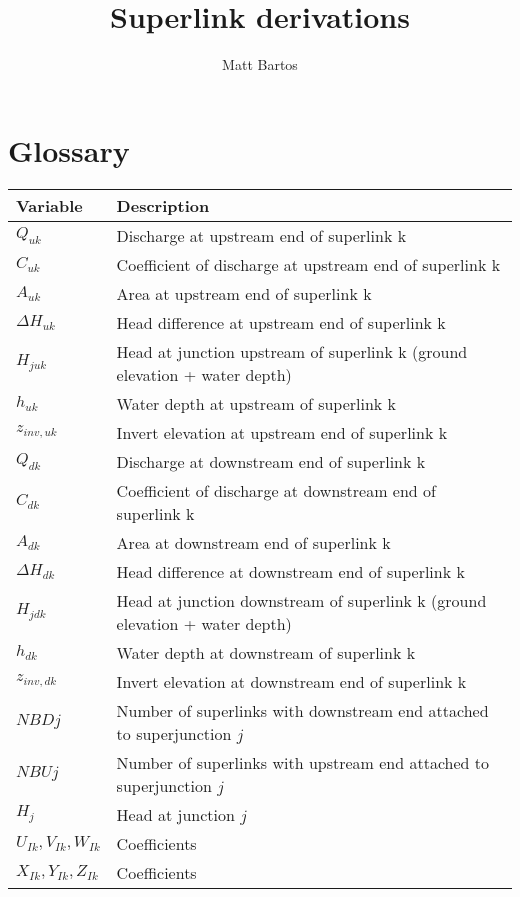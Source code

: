 \documentclass[11pt]{article}
\title{Superlink derivations}
\author{Matt Bartos}
\date{}
\begin{document}
\section*{Glossary}

\begin{table}[!htb]
  \centering
  \begin{tabular}{l | l}
    \hline
    Variable & Description \\
    \hline
    $Q_{uk}$ & Discharge at upstream end of superlink k \\
    $C_{uk}$ & Coefficient of discharge at upstream end of superlink k \\
    $A_{uk}$ & Area at upstream end of superlink k \\
    $\Delta H_{uk}$ & Head difference at upstream end of superlink k \\
    $H_{juk}$ & Head at junction upstream of superlink k (ground elevation + water depth) \\
    $h_{uk}$ & Water depth at upstream of superlink k \\
    $z_{inv, uk}$ & Invert elevation at upstream end of superlink k \\
    $Q_{dk}$ & Discharge at downstream end of superlink k \\
    $C_{dk}$ & Coefficient of discharge at downstream end of superlink k \\
    $A_{dk}$ & Area at downstream end of superlink k \\
    $\Delta H_{dk}$ & Head difference at downstream end of superlink k \\
    $H_{jdk}$ & Head at junction downstream of superlink k (ground elevation + water depth) \\
    $h_{dk}$ & Water depth at downstream of superlink k \\
    $z_{inv, dk}$ & Invert elevation at downstream end of superlink k \\
    $NBDj$ & Number of superlinks with downstream end attached to superjunction $j$ \\
    $NBUj$ & Number of superlinks with upstream end attached to superjunction $j$ \\
    $H_j$ & Head at junction $j$ \\
    $U_{Ik}, V_{Ik}, W_{Ik}$ & Coefficients \\
    $X_{Ik}, Y_{Ik}, Z_{Ik}$ & Coefficients \\
    \hline
  \end{tabular}
\end{table}
\end{document}
